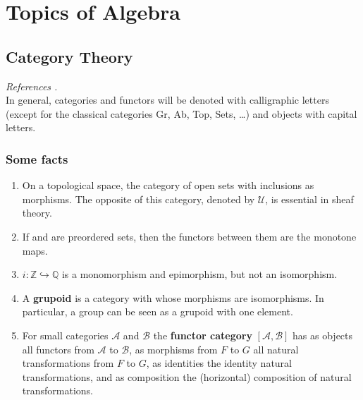\part{Topics of Algebra}


\chapter{Category Theory}

\textit{References \cite{adamekAbstractConcreteCategories2004,richterCategoriesHomotopyTheory2020}.}\\ %
In general, categories and functors will be denoted with calligraphic letters (except for the classical categories Gr, Ab, Top, Sets, \dots) and objects with capital letters.\\

\section{Some facts}  

\begin{example}
    \begin{enumerate}
        \item On a topological space, the category of open sets with inclusions as morphisms. The opposite of this category, denoted by $\mathcal{U}$, is essential in sheaf theory.
        \item If \ca and \cb are preordered sets, then the functors between them are the monotone maps.
        \item $i: \mathbb{Z} \hookrightarrow \mathbb{Q}$ is a monomorphism and epimorphism, but not an isomorphism.
        \item A \textbf{grupoid} is a category with whose morphisms are isomorphisms. In particular, a group can be seen as a grupoid with one element.
        \item For small categories $\mathcal{A}$ and $\mathcal{B}$ the \textbf{functor category} $[\mathcal{A}, \mathcal{B}]$ has as objects all functors from $\mathcal{A}$ to $\mathcal{B}$, as morphisms from $F$ to $G$ all natural transformations from $F$ to $G$, as identities the identity natural transformations, and as composition the (horizontal) composition of natural transformations.
    \end{enumerate}
\end{example}
\medspace

